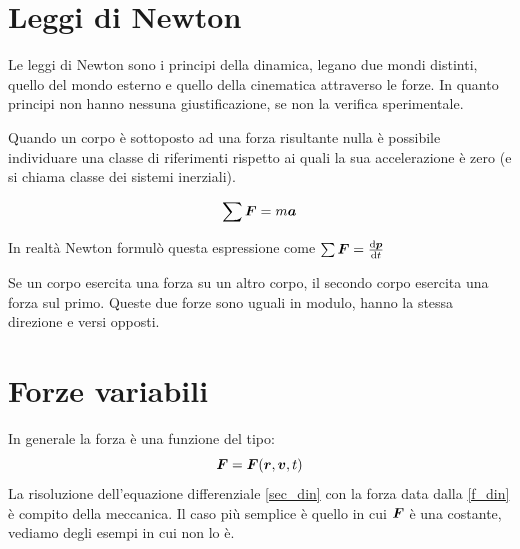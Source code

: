 \section{Leggi di Newton}
Le leggi di Newton sono i principi della dinamica, legano due mondi distinti, quello del mondo esterno e quello della cinematica attraverso le forze. In quanto principi non hanno nessuna giustificazione, se non la verifica sperimentale.
\begin{Pri}
Quando un corpo è sottoposto ad una forza risultante nulla è
possibile individuare una classe di riferimenti rispetto ai quali
la sua accelerazione è zero (e si chiama classe dei sistemi inerziali).
\end{Pri}
\begin{Pri}
\begin{equation}
\sum\boldsymbol{F}=m\boldsymbol{a}
\label{sec_din}
\end{equation}
\end{Pri}
In realtà Newton formulò questa espressione come $\sum \boldsymbol{F}=\frac{\mathrm{d} \boldsymbol{p}}{\mathrm{d} t}$
\begin{Pri}
Se un corpo esercita una forza su un altro corpo, il secondo corpo
esercita una forza sul primo. Queste due forze sono uguali in
modulo, hanno la stessa direzione e versi opposti.
\end{Pri}


\section{Forze variabili}
In generale la forza è una funzione del tipo:
\begin{equation}
\boldsymbol{F}=\boldsymbol{F}(\boldsymbol{r},\boldsymbol{v},t)
\label{f_din}
\end{equation}
La risoluzione dell'equazione differenziale \eqref{sec_din} con la forza data dalla \eqref{f_din} è compito della meccanica. Il caso più semplice è quello in cui $\boldsymbol{F}$ è una costante, vediamo degli esempi in cui non lo è.
